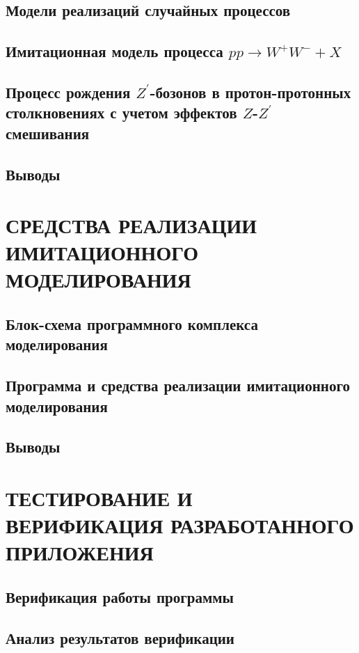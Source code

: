 \documentclass[12pt,a4paper]{styles/report}
\begin{document}
\section{Модели реализаций случайных процессов}

\section{Имитационная модель процесса $pp \rightarrow W^+W^- + X$}


\section{Процесс рождения $Z^\prime$-бозонов в протон-протонных столкновениях с учетом эффектов $Z$-$Z^\prime$ смешивания}

\section{Выводы}


\chapter{СРЕДСТВА РЕАЛИЗАЦИИ ИМИТАЦИОННОГО МОДЕЛИРОВАНИЯ}
\section{Блок-схема программного комплекса
	моделирования}

\section{Программа и средства реализации имитационного моделирования}

\section{Выводы}


\chapter{ТЕСТИРОВАНИЕ И ВЕРИФИКАЦИЯ РАЗРАБОТАННОГО ПРИЛОЖЕНИЯ}
\section{Верификация работы программы}

\section{Анализ результатов верификации}

\end{document}
